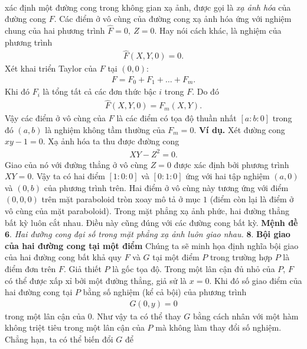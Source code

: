 \begin{multicols}{2}
\begin{align*}
	\end{align*}
	xác định một đường cong trong không gian xạ ảnh, được gọi là  {\em xạ ảnh hóa} của đường cong $F$. 
	\vskip 0.1cm
	Các điểm ở vô cùng của đường cong xạ ảnh hóa ứng với nghiệm chung của hai  phương trình  
	$\widehat F=0,\ Z=0.$
	Hay nói cách khác, là nghiệm của phương trình
	\begin{align*}
		\widehat F(X,Y,0)=0.
	\end{align*}
	Xét khai triển Taylor của $F$ tại $(0,0)$:
	\begin{align*}
		F=F_0+F_1+\ldots + F_m.
	\end{align*}
	Khi đó $F_i$ là tổng tất cả các đơn thức bậc $i$ trong $F$. Do đó 
	\begin{align*}
		\widehat F(X,Y,0)= F_m(X,Y).
	\end{align*}
	Vậy các điểm ở vô cùng của $F$  là các điểm có tọa độ thuần nhất $[a:b:0]$ trong đó $(a,b)$ là nghiệm không tầm thường của $F_m=0$.
	\vskip 0.1cm
	\textbf{\color{duongvaotoanhoc}Ví dụ.} Xét đường cong $xy-1=0$. Xạ ảnh hóa ta thu được đường cong
	\begin{align*}
		XY-Z^2=0.
	\end{align*}
	Giao của nó với đường thẳng ở vô cùng $Z=0$ được xác định bởi phương trình
	$XY=0.$
	Vậy ta có hai điểm $[1:0:0]$ và $[0:1:0]$ ứng với hai tập nghiệm $(a,0)$ và $(0,b)$ của phương trình trên. Hai điểm ở vô cùng này tương ứng với điểm $(0,0,0)$ trên mặt paraboloid tròn xoay mô tả ở mục $1$ (điểm còn lại là điểm ở vô cùng của mặt paraboloid).   
	\vskip 0.1cm
	Trong mặt phẳng xạ ảnh phức, hai đường thẳng bất kỳ luôn cắt nhau. Điều này cũng đúng với các đường cong bất kỳ. 
	\vskip 0.1cm
	\textbf{\color{duongvaotoanhoc}Mệnh đề} $\pmb{6.}$
	\textit{Hai đường cong đại số trong mặt phẳng xạ ảnh luôn giao nhau.}
	\vskip 0.1cm
	$\pmb{8.}$ \textbf{\color{duongvaotoanhoc}Bội giao của hai đường cong tại một điểm} 
	\vskip 0.1cm 
	Chúng ta sẽ minh họa định nghĩa bội giao của hai đường cong bất khả quy $F$  và $G$  tại một điểm $P$ trong trường hợp $P$ là điểm đơn trên $F$.  Giả thiết $P$ là gốc tọa độ. Trong một lân cận đủ nhỏ của $P$, $F$  có thể được xấp xỉ bởi một đường thẳng, giả sử là $x=0$. Khi đó số giao điểm của hai đường cong tại $P$ bằng số nghiệm (kể cả bội) của phương trình 
	\begin{align*}
		G(0,y)=0
	\end{align*}
	trong một lân cận của $0$. Như vậy ta có thể thay $G$ bằng cách nhân với một hàm không triệt tiêu trong một lân cận của $P$ mà không làm thay đổi số nghiệm. Chẳng hạn, ta có thể biến đổi $G$ để 

\end{multicols}
